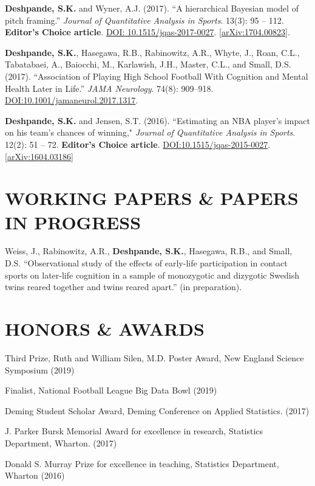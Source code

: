 \documentclass[margin]{res}
\begin{document}
\begin{resume}
\textbf{Deshpande, S.K.} and Wyner, A.J. (2017). ``A hierarchical Bayesian model of pitch framing.'' \textit{Journal of Quantitative Analysis in Sports}. 13(3): 95 -- 112. \textbf{Editor's Choice article}. \href{https://doi.org/10.1515/jqas-2017-0027}{DOI: 10.1515/jqas-2017-0027}. \href{https://arxiv.org/abs/1704.00823}{[arXiv:1704.00823]}.

\textbf{Deshpande, S.K.}, Hasegawa, R.B., Rabinowitz, A.R., Whyte, J., Roan, C.L., Tabatabaei, A., Baiocchi, M., Karlawish, J.H., Master, C.L., and Small, D.S. (2017). ``Association of Playing High School Football With Cognition and Mental Health Later in Life.'' \textit{JAMA Neurology}. 74(8): 909--918. \href{https://doi.org/10.1001/jamaneurol.2017.1317}{DOI:10.1001/jamaneurol.2017.1317}.

\textbf{Deshpande, S.K.} and Jensen, S.T. (2016). ``Estimating an NBA player's impact on his team's chances of winning," \textit{Journal of Quantitative Analysis in Sports}. 12(2): 51 -- 72. \textbf{Editor's Choice article}. \href{https://doi.org/10.1515/jqas-2015-0027}{DOI:10.1515/jqas-2015-0027}.\href{https://arxiv.org/abs/1604.03186}{[arXiv:1604.03186]}


\section{WORKING PAPERS \& PAPERS IN PROGRESS}

Weiss, J., Rabinowitz, A.R., \textbf{Deshpande, S.K.}, Hasegawa, R.B., and Small, D.S. ``Observational study of the effects of early-life participation in contact sports on later-life cognition in a sample of monozygotic and dizygotic Swedish twins reared together and twins reared apart.'' (in preparation).

\section{HONORS \& AWARDS} 

Third Prize, Ruth and William Silen, M.D. Poster Award, New England Science Symposium (2019)

Finalist, National Football League Big Data Bowl (2019)

Deming Student Scholar Award, Deming Conference on Applied Statistics. (2017)

J. Parker Bursk Memorial Award for excellence in research, Statistics Department, Wharton. (2017)

Donald S. Murray Prize for excellence in teaching, Statistics Department, Wharton (2016)


\end{resume}
\end{document}
